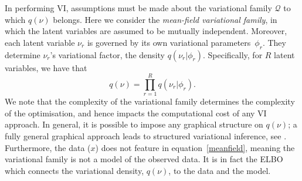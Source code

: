 \documentclass[11pt,a4paper]{article}
\begin{document}
In performing VI, assumptions must be made about the variational 
family $\mathcal Q$ to which $q(\nu)$ belongs. Here we consider the \emph{mean-field 
variational family}, in which the latent variables are assumed to be 
mutually independent. Moreover, each latent variable $\nu_r$ is 
governed by its own variational parameters~$\phi_r$. They determine 
$\nu_r$'s variational factor, the density $q(\nu_r\vert \phi_r)$. 
Specifically, for $R$ latent variables, we have that
\begin{equation}\label{meanfield}
q\left(\nu \right) = \prod_{r=1}^Rq\left(\nu_r\vert\phi_r\right).
\end{equation} 
We note that the complexity of the variational family determines the 
complexity of the optimisation, and hence impacts the computational 
cost of any VI approach. In general, it is possible to impose any 
graphical structure on $q(\nu)$; a fully general 
graphical approach leads to structured variational inference, see 
\cite{saul_1996}. Furthermore, the data ($x$) does not feature in 
equation~\eqref{meanfield}, meaning the variational family is not a 
model of the observed data. It is in fact the ELBO which connects the 
variational density, $q(\nu)$, to the data and the model.
\end{document}
